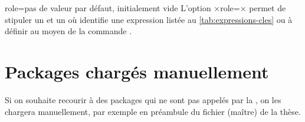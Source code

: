 
\begin{docKey}{role}{=}{pas de valeur par défaut, initialement
    vide}
  L'option ×role=× permet de stipuler un  et
  un  où  identifie une expression listée au
  \vref{tab:expressions-cles} ou à définir au moyen de la commande
  .
\end{docKey}


\section{Packages chargés manuellement}
\label{sec:options-de-classes}
Si on souhaite recourir à des packages qui ne sont pas appelés par la \yatcl{},
on les chargera manuellement, par exemple en préambule du fichier (maître) de
la thèse.
%
\iffalse
\fi
